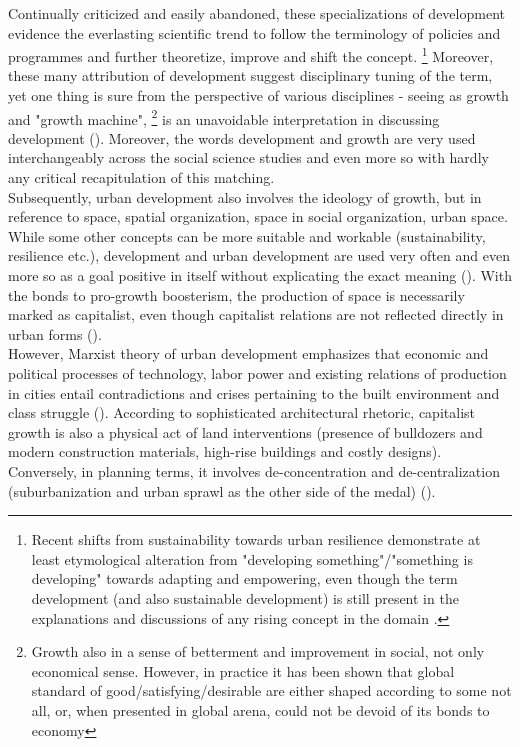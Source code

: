 \documentclass[11pt]{report}
\begin{document}
Continually criticized and easily abandoned, these specializations of development evidence the everlasting scientific trend to follow the terminology of policies and programmes and further theoretize, improve and shift the concept.
\footnote{Recent shifts from sustainability towards urban resilience  demonstrate at least etymological alteration from "developing something"/"something is developing" towards adapting and empowering, even though the term development (and also sustainable development) is still present in the explanations and discussions of any rising concept in the domain {\cite{ref web of science}}.}
Moreover, these many attribution of development suggest disciplinary tuning of the term, yet one thing is sure from the perspective of various disciplines - seeing as growth and "growth machine", \footnote{Growth also in a sense of betterment and improvement in social, not only economical sense.
However, in practice it has been shown that global standard of good/satisfying/desirable are either shaped according to some not all, or, when presented in global arena, could not be devoid of its bonds to economy} 
is an unavoidable interpretation in discussing development (\href{Gottdiener}{\citealt{Gottdiener1994}}).
Moreover, the words development and growth are very used interchangeably across the social science studies and even more so with hardly any critical recapitulation of this matching.
\\

Subsequently, urban development also involves the ideology of growth, but in reference to space, spatial organization, space in social organization, urban space.
While some other concepts can be more suitable and workable (sustainability, resilience etc.), development and urban development are used very often and even more so as a goal positive in itself without explicating the exact meaning (\href{ref}{\citealt{web of science results ivana popovic primer}}).
With the bonds to pro-growth boosterism, the production of space is necessarily marked as capitalist, even though capitalist relations are not reflected directly in urban forms (\href{Gottdiener}{\citealt{Gottdiener1994}}). 
\\

However, Marxist theory of urban development emphasizes that economic and political processes of technology, labor power and existing relations of production in cities entail contradictions and crises pertaining to the built environment and class struggle (\href{Harvey}{\citealt{harvey_urban_1978}}).
According to sophisticated architectural rhetoric, capitalist growth is also a physical act of land interventions (presence of bulldozers and modern construction materials, high-rise buildings and costly designs).
Conversely, in planning terms, it involves de-concentration and de-centralization (suburbanization and urban sprawl as the other side of the medal) (\href{Gottdiener}{\citealt{Gottdiener1994}}).
\\
\end{document}
